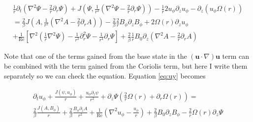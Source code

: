 \documentclass{paper}
\newcommand{\uphi}{\ensuremath{u_\phi}}
\newcommand\reye{\mathrm{Re}}
\begin{document}
\begin{multline}
\label{eq:Psi_perturbed}
\frac{1}{r}\partial_t \left(\nabla^2 \Psi - \frac{2}{r} \partial_r \Psi \right) + J\left(\Psi, \frac{1}{r^2} \left( \nabla^2 \Psi - \frac{2}{r} \partial_r\Psi\right) \right) - \frac{1}{r} 2 u_\phi \partial_z u_\phi - \partial_z\left(u_\phi \Omega(r) \right)\\
= \frac{2}{\beta} J\left(A, \frac{1}{r^2} \left( \nabla^2 A - \frac{2}{r} \partial_rA\right) \right) - \frac{2}{\beta} \frac{2}{r}B_\phi \partial_z B_\phi + 2 \Omega(r) \partial_z u_\phi \\
+ \frac{1}{\reye} \left[ \nabla^2 \left(\frac{1}{r} \nabla^2 \Psi\right) - \frac{1}{r^3} \partial_r^2 \Psi - \frac{1}{r^4}\partial_r\Psi\right] + \frac{2}{\beta} \frac{1}{r}B_0 \partial_z \left(\nabla^2 A - \frac{2}{r} \partial_r A\right) 
\end{multline}

Note that one of the terms gained from the base state in the $(\mathbf{u}\cdot \nabla)\mathbf{u}$ term can be combined with the term gained from the Coriolis term, but here I write them separately so we can check the equation.
Equation \ref{eq:uy} becomes

\begin{multline}
  \label{eq:uy_perturbed}
\partial_t \uphi + \frac{J(\psi, \uphi)}{r} + \frac{\uphi \partial_z \psi}{r^2} + \partial_z\Psi\left( \frac{2}{r}\Omega(r) + \partial_r \Omega(r) \right) = \\
\frac{2}{\beta} \frac{J(A, B_\phi)}{r} + \frac{2}{\beta} \frac{B_\phi \partial_z A}{r^2} + \frac{1}{\reye} \left( \nabla^2 \uphi - \frac{\uphi}{r}\right) + \frac{2}{\beta} B_0 \partial_z B_\phi -\frac{2}{r} \Omega(r) \partial_z \Psi
\end{multline}



\end{document}
